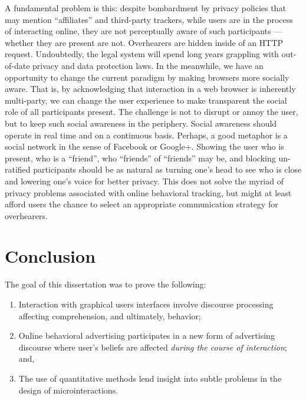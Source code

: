 A fundamental problem is this: despite bombardment by privacy policies that may mention ``affiliates'' and third-party trackers, while users are in the process of interacting online, they are not perceptually aware of such participants --- whether they are present are not. Overhearers are hidden inside of an HTTP request. Undoubtedly, the legal system will spend long years grappling with out-of-date privacy and data protection laws. In the meanwhile, we have an opportunity to change the current paradigm by making browsers more socially aware. That is, by acknowledging that interaction in a web browser is inherently multi-party, we can change the user experience to make transparent the social role of all participants present. The challenge is not to disrupt or annoy the user, but to keep such social awareness in the periphery. Social awareness should operate in real time and on a continuous basis. Perhaps, a good metaphor is a social network in the sense of Facebook or Google+. Showing the user who is present, who is a ``friend'', who ``friends'' of ``friends'' may be, and blocking un-ratified participants should be as natural as turning one's head to see who is close and lowering one's voice for better privacy. This does not solve the myriad of privacy problems associated with online behavioral tracking, but might at least afford users the chance to select an appropriate communication strategy for overhearers.

\section{Conclusion}
\label{conclusion}

The goal of this dissertation was to prove the following:

\begin{sloppier}
\begin{enumerate}
\item Interaction with graphical users interfaces involve discourse processing affecting comprehension, and ultimately, behavior;
\item Online behavioral advertising participates in a new form of advertising discourse where user's beliefs are affected \textit{during the course of interaction}; and,
\item The use of quantitative methods lend insight into subtle problems in the design of microinteractions.
\end{enumerate}
\end{sloppier}


